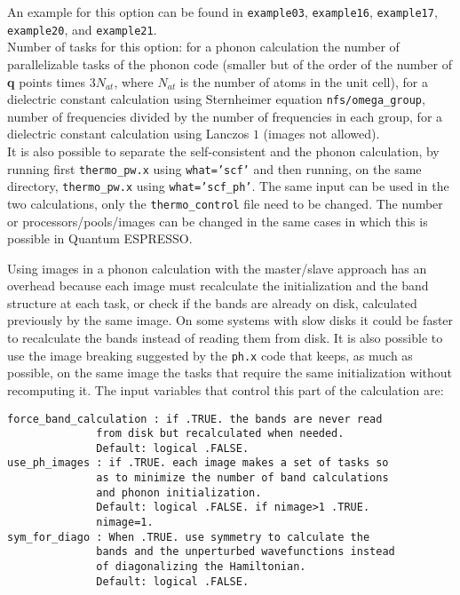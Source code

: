 \documentclass[12pt,a4paper,twoside]{report}
\begin{document}
An example for this option can be found in \texttt{example03},
\texttt{example16}, \texttt{example17}, \texttt{example20}, and 
\texttt{example21}. \\
Number of tasks for this option: for a phonon calculation the
number of parallelizable tasks of the 
phonon code (smaller but of the order of the number of {\bf q} points times 
$3 N_{at}$, where $N_{at}$ is the number of atoms in the unit cell), 
for a dielectric constant calculation using Sternheimer equation
\texttt{nfs/omega\_group}, number of frequencies divided by the number of 
frequencies in each group, for a dielectric constant calculation
using Lanczos $1$ (images not allowed). \\

It is also possible to separate the self-consistent and the phonon calculation,
by running first \texttt{thermo\_pw.x} using \texttt{what='scf'} and then
running, on the same directory, \texttt{thermo\_pw.x} using 
\texttt{what='scf\_ph'}. The same input can be used in the two 
calculations, only
the \texttt{thermo\_control} file need to be changed.
The number or processors/pools/images can be changed in the same cases in
which this is possible in Quantum ESPRESSO.

Using images in a phonon calculation with the master/slave approach
has an overhead because each image must recalculate the initialization
and the band structure at each task, or check if the bands are 
already on disk, calculated previously by the same image. On some systems 
with slow disks it could be faster to recalculate the bands instead of 
reading them from disk. It is also possible to use the image breaking
suggested by the \texttt{ph.x} code that keeps, as much as possible, 
on the same image the tasks that require the same initialization without
recomputing it.
The input variables that control this part of the calculation are:

\begin{verbatim}
force_band_calculation : if .TRUE. the bands are never read 
              from disk but recalculated when needed.
              Default: logical .FALSE.
use_ph_images : if .TRUE. each image makes a set of tasks so 
              as to minimize the number of band calculations 
              and phonon initialization.
              Default: logical .FALSE. if nimage>1 .TRUE. 
              nimage=1.
sym_for_diago : When .TRUE. use symmetry to calculate the 
              bands and the unperturbed wavefunctions instead 
              of diagonalizing the Hamiltonian.
              Default: logical .FALSE.
\end{verbatim}
\end{document}
